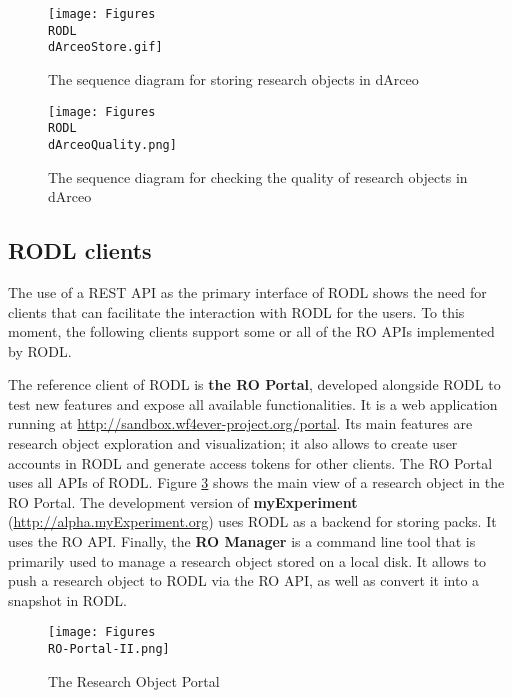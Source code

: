 \begin{figure}[!hb]
\centering
\texttt{[image: Figures\\RODL\\dArceoStore.gif]}
\caption{The sequence diagram for storing research objects in dArceo}
\label{dArceoStore}
\end{figure}

\begin{figure}[!hb]
\centering
\texttt{[image: Figures\\RODL\\dArceoQuality.png]}
\caption{The sequence diagram for checking the quality of research objects in dArceo}
\label{dArceoQuality}
\end{figure}

\subsection{RODL clients}

The use of a REST API as the primary interface of RODL shows the need for clients that can facilitate the interaction with RODL for the users. To this moment, the following clients support some or all of the RO APIs implemented by RODL.

The reference client of RODL is \textbf{the RO Portal}, developed alongside RODL to test new features and expose all available functionalities. It is a web application running at \url{http://sandbox.wf4ever-project.org/portal}. Its main features are research object exploration and visualization; it also allows to create user accounts in RODL and generate access tokens for other clients. The RO Portal uses all APIs of RODL. Figure \ref{Portal} shows the main view of a research object in the RO Portal. The development version of \textbf{myExperiment} \cite{myExperiment} (\url{http://alpha.myExperiment.org}) uses RODL as a backend for storing packs. It uses the RO API. Finally, the \textbf{RO Manager} \cite{RO-Manager} is a command line tool that is primarily used to manage a research object stored on a local disk. It allows to push a research object to RODL via the RO API, as well as convert it into a snapshot in RODL.

\begin{figure}[!hb]
\centering
\texttt{[image: Figures\\RO-Portal-II.png]}
\caption{The Research Object Portal}
\label{Portal}
\end{figure}
